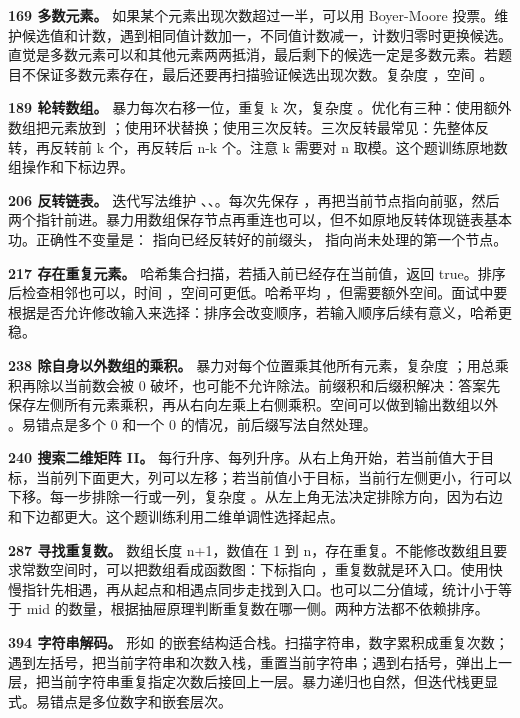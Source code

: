 \textbf{169 多数元素。} 如果某个元素出现次数超过一半，可以用 Boyer-Moore 投票。维护候选值和计数，遇到相同值计数加一，不同值计数减一，计数归零时更换候选。直觉是多数元素可以和其他元素两两抵消，最后剩下的候选一定是多数元素。若题目不保证多数元素存在，最后还要再扫描验证候选出现次数。复杂度 ，空间 。

\textbf{189 轮转数组。} 暴力每次右移一位，重复 k 次，复杂度 。优化有三种：使用额外数组把元素放到 ；使用环状替换；使用三次反转。三次反转最常见：先整体反转，再反转前 k 个，再反转后 n-k 个。注意 k 需要对 n 取模。这个题训练原地数组操作和下标边界。

\textbf{206 反转链表。} 迭代写法维护 、、。每次先保存 ，再把当前节点指向前驱，然后两个指针前进。暴力用数组保存节点再重连也可以，但不如原地反转体现链表基本功。正确性不变量是： 指向已经反转好的前缀头， 指向尚未处理的第一个节点。

\textbf{217 存在重复元素。} 哈希集合扫描，若插入前已经存在当前值，返回 true。排序后检查相邻也可以，时间 ，空间可更低。哈希平均 ，但需要额外空间。面试中要根据是否允许修改输入来选择：排序会改变顺序，若输入顺序后续有意义，哈希更稳。

\textbf{238 除自身以外数组的乘积。} 暴力对每个位置乘其他所有元素，复杂度 ；用总乘积再除以当前数会被 0 破坏，也可能不允许除法。前缀积和后缀积解决：答案先保存左侧所有元素乘积，再从右向左乘上右侧乘积。空间可以做到输出数组以外 。易错点是多个 0 和一个 0 的情况，前后缀写法自然处理。

\textbf{240 搜索二维矩阵 II。} 每行升序、每列升序。从右上角开始，若当前值大于目标，当前列下面更大，列可以左移；若当前值小于目标，当前行左侧更小，行可以下移。每一步排除一行或一列，复杂度 。从左上角无法决定排除方向，因为右边和下边都更大。这个题训练利用二维单调性选择起点。

\textbf{287 寻找重复数。} 数组长度 n+1，数值在 1 到 n，存在重复。不能修改数组且要求常数空间时，可以把数组看成函数图：下标指向 ，重复数就是环入口。使用快慢指针先相遇，再从起点和相遇点同步走找到入口。也可以二分值域，统计小于等于 mid 的数量，根据抽屉原理判断重复数在哪一侧。两种方法都不依赖排序。

\textbf{394 字符串解码。} 形如  的嵌套结构适合栈。扫描字符串，数字累积成重复次数；遇到左括号，把当前字符串和次数入栈，重置当前字符串；遇到右括号，弹出上一层，把当前字符串重复指定次数后接回上一层。暴力递归也自然，但迭代栈更显式。易错点是多位数字和嵌套层次。


